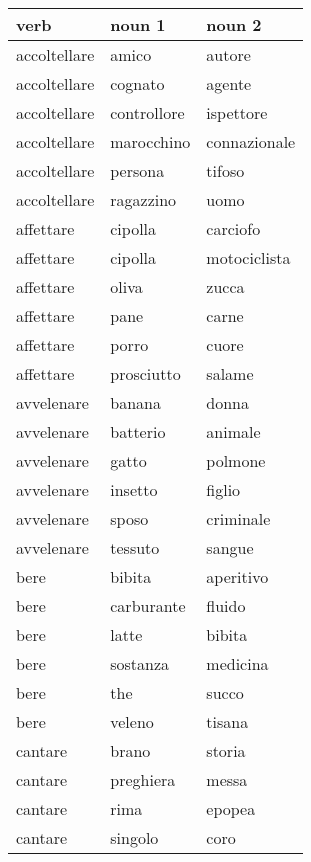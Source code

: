 \begin{longtable}{l|ll}
\textbf{verb}      & \textbf{noun 1}    & \textbf{noun 2}    \\
\hline
\endhead
accoltellare   & amico         & autore       \\
accoltellare   & cognato       & agente       \\
accoltellare   & controllore   & ispettore    \\
accoltellare   & marocchino    & connazionale \\
accoltellare   & persona       & tifoso       \\
accoltellare   & ragazzino     & uomo         \\
affettare      & cipolla       & carciofo     \\
affettare      & cipolla       & motociclista \\
affettare      & oliva         & zucca        \\
affettare      & pane          & carne        \\
affettare      & porro         & cuore        \\
affettare      & prosciutto    & salame       \\
avvelenare     & banana        & donna        \\
avvelenare     & batterio      & animale      \\
avvelenare     & gatto         & polmone      \\
avvelenare     & insetto       & figlio       \\
avvelenare     & sposo         & criminale    \\
avvelenare     & tessuto       & sangue       \\
bere           & bibita        & aperitivo    \\
bere           & carburante    & fluido       \\
bere           & latte         & bibita       \\
bere           & sostanza      & medicina     \\
bere           & the           & succo        \\
bere           & veleno        & tisana       \\
cantare        & brano         & storia       \\
cantare        & preghiera     & messa        \\
cantare        & rima          & epopea       \\
cantare        & singolo       & coro         \\

\end{longtable}
